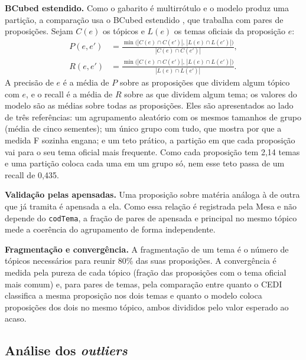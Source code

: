 \textbf{BCubed estendido.} Como o gabarito é multirrótulo e o modelo produz uma partição, a comparação usa o BCubed estendido \citep{amigo2009comparison}, que trabalha com pares de proposições. Sejam $C(e)$ os tópicos e $L(e)$ os temas oficiais da proposição $e$:
\begin{align}
P(e, e') &= \frac{\min\big(|C(e) \cap C(e')|,\, |L(e) \cap L(e')|\big)}{|C(e) \cap C(e')|}, \\
R(e, e') &= \frac{\min\big(|C(e) \cap C(e')|,\, |L(e) \cap L(e')|\big)}{|L(e) \cap L(e')|}.
\end{align}
A precisão de $e$ é a média de $P$ sobre as proposições que dividem algum tópico com $e$, e o recall é a média de $R$ sobre as que dividem algum tema; os valores do modelo são as médias sobre todas as proposições. Eles são apresentados ao lado de três referências: um agrupamento aleatório com os mesmos tamanhos de grupo (média de cinco sementes); um único grupo com tudo, que mostra por que a medida F sozinha engana; e um teto prático, a partição em que cada proposição vai para o seu tema oficial mais frequente. Como cada proposição tem 2,14 temas e uma partição coloca cada uma em um grupo só, nem esse teto passa de um recall de 0,435.

\textbf{Validação pelas apensadas.} Uma proposição sobre matéria análoga à de outra que já tramita é apensada a ela. Como essa relação é registrada pela Mesa e não depende do \texttt{codTema}, a fração de pares de apensada e principal no mesmo tópico mede a coerência do agrupamento de forma independente.

\textbf{Fragmentação e convergência.} A fragmentação de um tema é o número de tópicos necessários para reunir 80\% das suas proposições. A convergência é medida pela pureza de cada tópico (fração das proposições com o tema oficial mais comum) e, para pares de temas, pela comparação entre quanto o CEDI classifica a mesma proposição nos dois temas e quanto o modelo coloca proposições dos dois no mesmo tópico, ambos divididos pelo valor esperado ao acaso.

\subsection{Análise dos \textit{outliers}}
\label{subsec:outliers}

